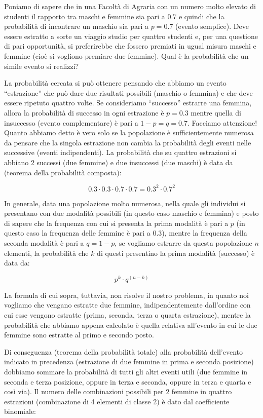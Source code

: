 \documentclass[a4paper,12pt,oneside]{book}
\theoremstyle{definition}
\theoremstyle{definition}
\theoremstyle{definition}
\theoremstyle{remark}
\begin{document}
Poniamo di sapere che in una Facoltà di Agraria con un numero molto
elevato di studenti il rapporto tra maschi e femmine sia pari a 0.7 e
quindi che la probabilità di incontrare un maschio sia pari a
\(p = 0.7\) (evento semplice). Deve essere estratto a sorte un viaggio
studio per quattro studenti e, per una questione di pari opportunità, si
preferirebbe che fossero premiati in ugual misura maschi e femmine (cioè
si vogliono premiare due femmine). Qual è la probabilità che un simile
evento si realizzi?

La probabilità cercata si può ottenere pensando che abbiamo un evento
``estrazione'' che può dare due risultati possibili (maschio o femmina)
e che deve essere ripetuto quattro volte. Se consideriamo ``successo''
estrarre una femmina, allora la probabilità di successo in ogni
estrazione è \(p = 0.3\) mentre quella di insuccesso (evento
complementare) è pari a \(1 - p = q = 0.7\). Facciamo attenzione! Quanto
abbiamo detto è vero solo se la popolazione è sufficientemente numerosa
da pensare che la singola estrazione non cambia la probabilità degli
eventi nelle successive (eventi indipendenti). La probabilità che su
quattro estrazioni si abbiano 2 successi (due femmine) e due insuccessi
(due maschi) è data da (teorema della probabilità composta):

\[0.3 \cdot 0.3 \cdot 0.7 \cdot 0.7 = 0.3^2 \cdot 0.7^2\]

In generale, data una popolazione molto numerosa, nella quale gli
individui si presentano con due modalità possibili (in questo caso
maschio e femmina) e posto di sapere che la frequenza con cui si
presenta la prima modalità è pari a \(p\) (in questo caso la frequenza
delle femmine è pari a 0.3), mentre la frequenza della seconda modalità
è pari a \(q = 1 - p\), se vogliamo estrarre da questa popolazione \(n\)
elementi, la probabilità che \(k\) di questi presentino la prima
modalità (successo) è data da:

\[p^k \cdot q^{(n-k)}\]

La formula di cui sopra, tuttavia, non risolve il nostro problema, in
quanto noi vogliamo che vengano estratte due femmine, indipendentemente
dall'ordine con cui esse vengono estratte (prima, seconda, terza o
quarta estrazione), mentre la probabilità che abbiamo appena calcolato è
quella relativa all'evento in cui le due femmine sono estratte al primo
e secondo posto.

Di conseguenza (teorema della probabilità totale) alla probabilità
dell'evento indicato in precedenza (estrazione di due femmine in prima e
seconda posizione) dobbiamo sommare la probabilità di tutti gli altri
eventi utili (due femmine in seconda e terza posizione, oppure in terza
e seconda, oppure in terza e quarta e così via). Il numero delle
combinazioni possibili per 2 femmine in quattro estrazioni (combinazione
di 4 elementi di classe 2) è dato dal coefficiente binomiale:
\end{document}
